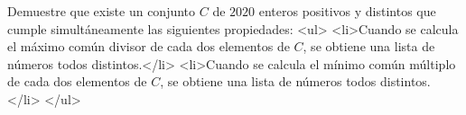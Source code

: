Demuestre que existe un conjunto $C$ de $2020$ enteros positivos y distintos que cumple simultáneamente las siguientes propiedades:
<ul>
  <li>Cuando se calcula el máximo común divisor de cada dos elementos de $C$, se obtiene una lista de números todos distintos.</li>
  <li>Cuando se calcula el mínimo común múltiplo de cada dos elementos de $C$, se obtiene una lista de números todos distintos.</li>
</ul>
